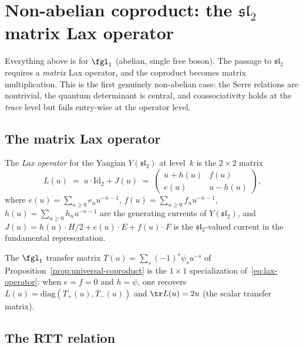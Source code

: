 \section{Non-abelian coproduct: the \texorpdfstring{$\mathfrak{sl}_2$}{sl-2} matrix Lax operator}
\label{sec:nonabelian-matrix-lax}

Everything above is for $\fgl_1$ (abelian, single free boson).
The passage to $\mathfrak{sl}_2$ requires a \emph{matrix} Lax operator,
and the coproduct becomes matrix multiplication.
This is the first genuinely non-abelian case: the Serre
relations are nontrivial, the quantum determinant is central,
and coassociativity holds at the \emph{trace} level but fails
entry-wise at the operator level.

\subsection{The matrix Lax operator}
\label{subsec:matrix-lax}

\begin{definition}
\label{def:matrix-lax}
The \emph{Lax operator} for the Yangian $Y(\mathfrak{sl}_2)$ at level~$k$
is the $2 \times 2$ matrix
\begin{equation}\label{eq:lax-operator}
 L(u) \;=\; u \cdot \mathrm{Id}_2 + J(u)
 \;=\; \begin{pmatrix} u + h(u) & f(u) \\ e(u) & u - h(u) \end{pmatrix},
\end{equation}
where $e(u) = \sum_{n \geq 0} e_n u^{-n-1}$,
$f(u) = \sum_{n \geq 0} f_n u^{-n-1}$,
$h(u) = \sum_{n \geq 0} h_n u^{-n-1}$ are the generating currents
of $Y(\mathfrak{sl}_2)$, and $J(u) = h(u) \cdot H/2 + e(u) \cdot E + f(u) \cdot F$ is the $\mathfrak{sl}_2$-valued current in the fundamental representation.
\end{definition}

The $\fgl_1$ transfer matrix $T(u) = \sum_s (-1)^s \psi_s u^{-s}$
of Proposition~\ref{prop:universal-coproduct} is the $1 \times 1$
specialization of~\eqref{eq:lax-operator}: when $e = f = 0$
and $h = \psi$, one recovers $L(u) = \mathrm{diag}(T_+(u), T_-(u))$
and $\tr L(u) = 2u$ (the scalar transfer matrix).

\subsection{The RTT relation}
\label{subsec:rtt}

